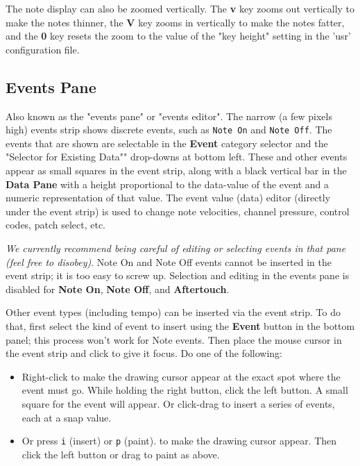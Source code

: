    The note display can also be zoomed vertically.
   The \textbf{v} key zooms out vertically to make the notes thinner,
   the \textbf{V} key zooms in vertically to make the notes fatter,
   and the \textbf{0} key resets the zoom to the value of the "key height"
   setting in the 'usr' configuration file.
   
\subsection{Events Pane}
\label{subsec:pattern_editor_panel}

   Also known as the "events pane" or "events editor".
   The narrow (a few pixels high) events strip shows discrete events,
   such as \texttt{Note On} and \texttt{Note Off}.
   The events that are shown are selectable in the \textbf{Event} category
   selector and the "Selector for Existing Data"" drop-downs at bottom left.
   These and other events appear
   as small squares in the event strip, along with a black vertical bar
   in the \textbf{Data Pane} with a
   height proportional to the data-value of the event and a numeric
   representation of that value.
	The event value (data) editor (directly under the event strip) is used 
	to change note velocities, channel pressure, control codes,
	patch select, etc.

   \textsl{We currently recommend being careful of editing or selecting events
   in that pane (feel free to disobey)}.
   Note On and Note Off events cannot be inserted in the event strip;
   it is too easy to screw up.
   Selection and editing in the events pane is disabled for
   \textbf{Note On}, \textbf{Note Off}, and \textbf{Aftertouch}.

   Other event types (including tempo) can be inserted via the event strip.
   To do that, first select the kind of event to insert using the
   \textbf{Event} button in the bottom panel; this process won't work
   for Note events.
   Then place the mouse cursor in the event strip and click to give it
   focus.
   Do one of the following:

   \begin{itemize}
      \item Right-click to make the drawing cursor appear at
         the exact spot where the event must go.  While holding the right
         button, click the left button.
         A small square for the event will appear.
         Or click-drag to insert a
         series of events, each at a snap value.
      \item Or press \texttt{i} (insert) or \texttt{p} (paint).
         to make the drawing cursor appear.
         Then click the left button or drag to paint as above.
   \end{itemize}

